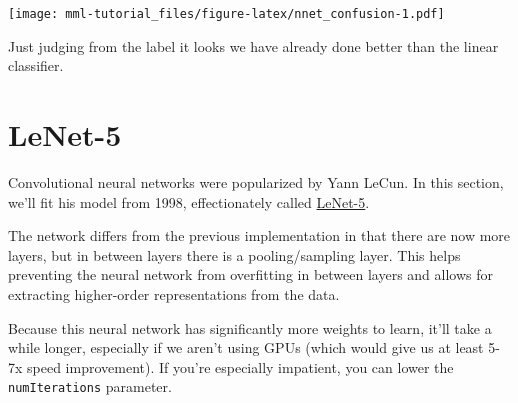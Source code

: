 \documentclass[]{book}
\newenvironment{Shaded}{\begin{snugshade}}{\end{snugshade}}
\newcommand{\KeywordTok}[1]{\textcolor[rgb]{0.13,0.29,0.53}{\textbf{#1}}}
\newcommand{\DataTypeTok}[1]{\textcolor[rgb]{0.13,0.29,0.53}{#1}}
\newcommand{\DecValTok}[1]{\textcolor[rgb]{0.00,0.00,0.81}{#1}}
\newcommand{\FloatTok}[1]{\textcolor[rgb]{0.00,0.00,0.81}{#1}}
\newcommand{\StringTok}[1]{\textcolor[rgb]{0.31,0.60,0.02}{#1}}
\newcommand{\OperatorTok}[1]{\textcolor[rgb]{0.81,0.36,0.00}{\textbf{#1}}}
\newcommand{\NormalTok}[1]{#1}
\theoremstyle{definition}
\theoremstyle{definition}
\theoremstyle{definition}
\theoremstyle{remark}
\begin{document}
\texttt{[image: mml-tutorial\_files/figure-latex/nnet\_confusion-1.pdf]}

Just judging from the label it looks we have already done better than
the linear classifier.

\section{LeNet-5}\label{lenet-5}

Convolutional neural networks were popularized by Yann LeCun. In this
section, we'll fit his model from 1998, effectionately called
\href{http://yann.lecun.com/exdb/publis/pdf/lecun-98.pdf}{LeNet-5}.

The network differs from the previous implementation in that there are
now more layers, but in between layers there is a pooling/sampling
layer. This helps preventing the neural network from overfitting in
between layers and allows for extracting higher-order representations
from the data.

Because this neural network has significantly more weights to learn,
it'll take a while longer, especially if we aren't using GPUs (which
would give us at least 5-7x speed improvement). If you're especially
impatient, you can lower the \texttt{numIterations} parameter.

\begin{Shaded}
\end{Shaded}
\end{document}
